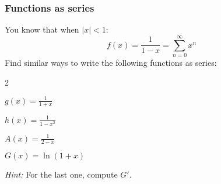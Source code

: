 \documentclass[14pt]{beamer}
\newcommand{\p}{\pause}
\newcommand{\setsize}[1]{\fontsize{#1}{#1}\selectfont} %
\newcommand{\smallerfont}{\setsize{13}} %
\begin{document}
	\begin{frame}[t]
		\smallerfont
		\frametitle{Functions as series}

		You know that when $|x|<1$:
		\vspace{-.2cm}
		\[
			f(x) = \frac{1}{1-x}= \sum_{n=0}^{\infty}x^{n}
		\]
		Find similar ways to write the following functions as series:
		\begin{enumerate}
		\end{enumerate}
		\vspace{.2cm}
		\emph{Hint:} For the last one, compute $G'$.
	\end{frame}
\end{document}
